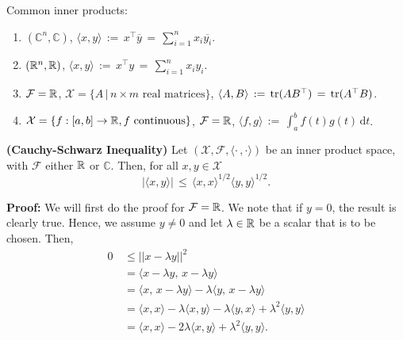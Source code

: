 \begin{example} Common inner products:
    \begin{enumerate}
        \renewcommand{\labelenumi}{(\alph{enumi})}
        \setlength{\itemsep}{.1cm}
        \item $(\mathbb{C}^n, \mathbb{C})$, $\langle x, y\rangle\, :=\, x^\top \overline{y}\, =\, \sum\limits_{i=1}^{n}x_i\overline{y_i}$.
        \item $(\mathbb R ^n,\mathbb R)$, $\langle x, y\rangle\, :=\, {x^\top }{y}\, =\, \sum\limits_{i=1}^{n}{x_i}{y_i}$.
        \item $\mathcal{F} =\mathbb R$, $\mathcal{X} = \{A\, |\, n\times m \,\, \text{real matrices} \}$, $\langle A, B\rangle\, :=\, \operatorname*{\rm tr}(AB^\top )\, = \, \operatorname*{\rm tr}(A^\top  B)$.
        \item $\mathcal{X} = \{ f: [a, b]\rightarrow\mathbb R , \text{$f$ continuous}\}$, $\mathcal{F} =\mathbb R$, $\langle f, g\rangle\, :=\,  \int_a^b \! f(t)g(t) \, \mathrm{d}t$.
    \end{enumerate}

\end{example}

\begin{thm}
    \textbf{(Cauchy-Schwarz Inequality)} Let $(\mathcal{X}, \mathcal{F}, \langle \cdot\,,\cdot \rangle)$ be an inner product space, with $\mathcal{F}$ either $\mathbb R $ or $\mathbb{C}$. Then, for all $x, y\in \mathcal{X}$
    \begin{equation*}
        |\langle x, y\rangle|\, \le\, {\langle x, x \rangle}^{1/2}\langle y, y \rangle ^{1/2}.
    \end{equation*}
\end{thm}

\textbf{Proof:} We will first do the proof for $\mathcal{F} =\mathbb R$.  We note that if $y = 0$, the result is clearly true. Hence, we assume $y \neq 0$ and let $\lambda \in\mathbb R$ be a scalar that is to be chosen. Then,
    \begin{align*}
        0\, & \le ||x - \lambda y||^2 \\
        &=  \langle x-\lambda y,\, x-\lambda y \rangle\\
        &=\langle x,\, x-\lambda y \rangle - \lambda\langle y,\, x-\lambda y\rangle\\
        &=\langle x, x\rangle - \lambda\langle x, y\rangle - \lambda\langle y, x\rangle +
        \lambda^2 \langle y, y\rangle \\
        &=\langle x, x\rangle - 2\lambda\langle x, y\rangle + \lambda^2\langle y,y\rangle.
    \end{align*}

